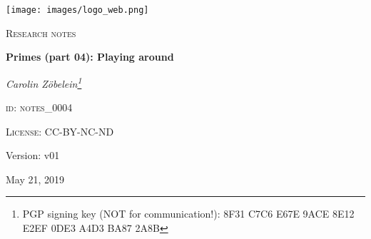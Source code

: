 

\begin{titlepage}
	\begin{center}
    \begin{center}
            \texttt{[image: images/logo\_web.png]}
    \end{center}
    \vspace{1cm}
	{\scshape\Large Research notes\par}
	\vspace{1.5cm}
	{\huge\bfseries Primes (part 04): Playing around\par}
	\vspace{2cm}
	{\Large\itshape Carolin Z\"obelein\footnote{PGP signing key (NOT for communication!): 8F31 C7C6 E67E 9ACE 8E12 E2EF 0DE3 A4D3 BA87 2A8B}\par}
	\vfill
	\textsc{id: notes\_0004}\par
	\textsc{License: CC-BY-NC-ND}
	\vfill


	\vfill

	{\large Version: v01\par}
	{\large May 21, 2019\par}
	\end{center}
\end{titlepage}

